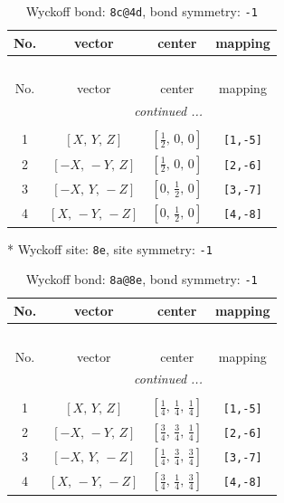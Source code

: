 \documentclass[fleqn,8pt]{jsarticle}
\begin{document}
\begin{longtable}{cccc}
\caption{Wyckoff bond: {\tt 8c@4d}, bond symmetry: {\tt -1}}
 \\
 \hline \hline
No. & vector & center & mapping \\ \hline \endfirsthead

\multicolumn{3}{l}{\tablename\ \thetable{}} \\
 \hline \hline
No. & vector & center & mapping \\ \hline \endhead

 \hline \hline
\multicolumn{3}{r}{\footnotesize\it continued ...} \\ \endfoot

 \hline \hline
\multicolumn{3}{r}{} \\ \endlastfoot

1 & $\left[ X,\, Y,\, Z \right]$ & $\left[ \frac{1}{2},\, 0,\, 0 \right]$ & {\tt [1,-5]} \\ \hline
2 & $\left[ - X,\, - Y,\, Z \right]$ & $\left[ \frac{1}{2},\, 0,\, 0 \right]$ & {\tt [2,-6]} \\ \hline
3 & $\left[ - X,\, Y,\, - Z \right]$ & $\left[ 0,\, \frac{1}{2},\, 0 \right]$ & {\tt [3,-7]} \\ \hline
4 & $\left[ X,\, - Y,\, - Z \right]$ & $\left[ 0,\, \frac{1}{2},\, 0 \right]$ & {\tt [4,-8]} \\
\end{longtable}
* Wyckoff site: {\tt 8e}, site symmetry: {\tt -1}
\renewcommand{\arraystretch}{1.2}
\begin{longtable}{cccc}
\caption{Wyckoff bond: {\tt 8a@8e}, bond symmetry: {\tt -1}}
 \\
 \hline \hline
No. & vector & center & mapping \\ \hline \endfirsthead

\multicolumn{3}{l}{\tablename\ \thetable{}} \\
 \hline \hline
No. & vector & center & mapping \\ \hline \endhead

 \hline \hline
\multicolumn{3}{r}{\footnotesize\it continued ...} \\ \endfoot

 \hline \hline
\multicolumn{3}{r}{} \\ \endlastfoot

1 & $\left[ X,\, Y,\, Z \right]$ & $\left[ \frac{1}{4},\, \frac{1}{4},\, \frac{1}{4} \right]$ & {\tt [1,-5]} \\ \hline
2 & $\left[ - X,\, - Y,\, Z \right]$ & $\left[ \frac{3}{4},\, \frac{3}{4},\, \frac{1}{4} \right]$ & {\tt [2,-6]} \\ \hline
3 & $\left[ - X,\, Y,\, - Z \right]$ & $\left[ \frac{1}{4},\, \frac{3}{4},\, \frac{3}{4} \right]$ & {\tt [3,-7]} \\ \hline
4 & $\left[ X,\, - Y,\, - Z \right]$ & $\left[ \frac{3}{4},\, \frac{1}{4},\, \frac{3}{4} \right]$ & {\tt [4,-8]} \\
\end{longtable}
\end{document}
